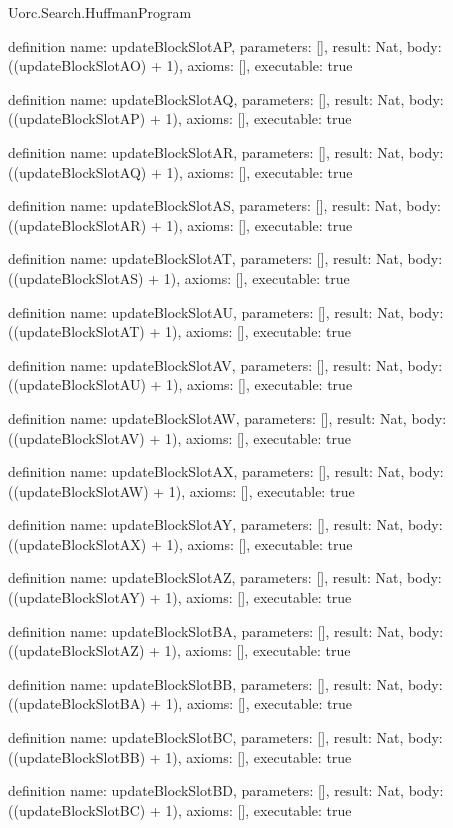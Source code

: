 \begin{lexlean}{Uorc.Search.HuffmanProgram}
\begin{semanticmodule}
definition{
  name: updateBlockSlotAP,
  parameters: [],
  result: Nat,
  body: ((updateBlockSlotAO) + 1),
  axioms: [],
  executable: true
}

definition{
  name: updateBlockSlotAQ,
  parameters: [],
  result: Nat,
  body: ((updateBlockSlotAP) + 1),
  axioms: [],
  executable: true
}

definition{
  name: updateBlockSlotAR,
  parameters: [],
  result: Nat,
  body: ((updateBlockSlotAQ) + 1),
  axioms: [],
  executable: true
}

definition{
  name: updateBlockSlotAS,
  parameters: [],
  result: Nat,
  body: ((updateBlockSlotAR) + 1),
  axioms: [],
  executable: true
}

definition{
  name: updateBlockSlotAT,
  parameters: [],
  result: Nat,
  body: ((updateBlockSlotAS) + 1),
  axioms: [],
  executable: true
}

definition{
  name: updateBlockSlotAU,
  parameters: [],
  result: Nat,
  body: ((updateBlockSlotAT) + 1),
  axioms: [],
  executable: true
}

definition{
  name: updateBlockSlotAV,
  parameters: [],
  result: Nat,
  body: ((updateBlockSlotAU) + 1),
  axioms: [],
  executable: true
}

definition{
  name: updateBlockSlotAW,
  parameters: [],
  result: Nat,
  body: ((updateBlockSlotAV) + 1),
  axioms: [],
  executable: true
}

definition{
  name: updateBlockSlotAX,
  parameters: [],
  result: Nat,
  body: ((updateBlockSlotAW) + 1),
  axioms: [],
  executable: true
}

definition{
  name: updateBlockSlotAY,
  parameters: [],
  result: Nat,
  body: ((updateBlockSlotAX) + 1),
  axioms: [],
  executable: true
}

definition{
  name: updateBlockSlotAZ,
  parameters: [],
  result: Nat,
  body: ((updateBlockSlotAY) + 1),
  axioms: [],
  executable: true
}

definition{
  name: updateBlockSlotBA,
  parameters: [],
  result: Nat,
  body: ((updateBlockSlotAZ) + 1),
  axioms: [],
  executable: true
}

definition{
  name: updateBlockSlotBB,
  parameters: [],
  result: Nat,
  body: ((updateBlockSlotBA) + 1),
  axioms: [],
  executable: true
}

definition{
  name: updateBlockSlotBC,
  parameters: [],
  result: Nat,
  body: ((updateBlockSlotBB) + 1),
  axioms: [],
  executable: true
}

definition{
  name: updateBlockSlotBD,
  parameters: [],
  result: Nat,
  body: ((updateBlockSlotBC) + 1),
  axioms: [],
  executable: true
}


\end{semanticmodule}
\end{lexlean}
